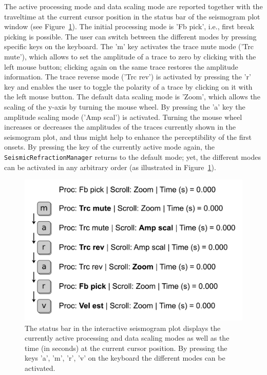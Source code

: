 \documentclass[a4paper,fleqn]{cas-sc}
\begin{document}
The active processing mode and data scaling mode are reported together with the traveltime at the current cursor position in the status bar of the seismogram plot window (see Figure~\ref{fig:statusbar_intro}).
The initial processing mode is 'Fb pick', i.e., first break picking is possible. The user can switch between the different modes by pressing specific keys on the keyboard. The 'm' key activates the trace mute mode ('Trc mute'), which allows to set the amplitude of a trace to zero by clicking with the left mouse button; clicking again on the same trace restores the amplitude information. The trace reverse mode ('Trc rev') is activated by pressing the 'r' key and enables the user to toggle the polarity of a trace by clicking on it with the left mouse button. 
The default data scaling mode is 'Zoom', which allows the scaling of the y-axis by turning the mouse wheel. By pressing the 'a' key the amplitude scaling mode ('Amp scal') is activated. Turning the mouse wheel increases or decreases the amplitudes of the traces currently shown in the seismogram plot, and thus might help to enhance the perceptibility of the first onsets.
By pressing the key of the currently active mode again, the \texttt{SeismicRefractionManager} returns to the default mode; yet, the different modes can be activated in any arbitrary order (as illustrated in Figure~\ref{fig:statusbar_intro}).
\begin{figure}
	\centering
	\includegraphics[width=.75\textwidth]{figures/status_bar.pdf}
	\caption{The status bar in the interactive seismogram plot displays the currently active processing and data scaling modes as well as the time (in seconds) at the current cursor position. By pressing the keys 'a', 'm', 'r', 'v' on the keyboard the different modes can be activated.}
	\label{fig:statusbar_intro}
\end{figure}
\end{document}
